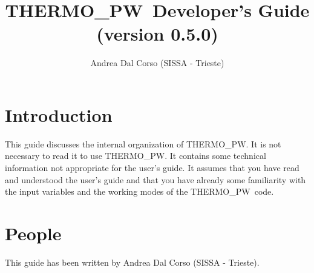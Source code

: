 \documentclass[12pt,a4paper]{article}
\def\version{0.5.0}
\def\tpw{{\sc THERMO\_PW}}
\begin{document}
\author{Andrea Dal Corso (SISSA - Trieste)}
\date{}


\title{
  \vskip 1cm
  {\color{red}\Huge \tpw\ Developer's Guide} \\
  \Large (version \version)
}
\maketitle

\tableofcontents

\newpage

\section{\color{coral}Introduction}
This guide discusses the internal organization of \tpw. It is not necessary
to read it to use \tpw. It contains some technical information not 
appropriate for the user's guide.
It assumes that you have read and understood the user's guide and that
you have already some familiarity with the input variables and 
the working modes of the \tpw\ code.

\section{\color{coral}People}
This guide has been written by Andrea Dal Corso (SISSA - Trieste). 

\newpage
\end{document}
